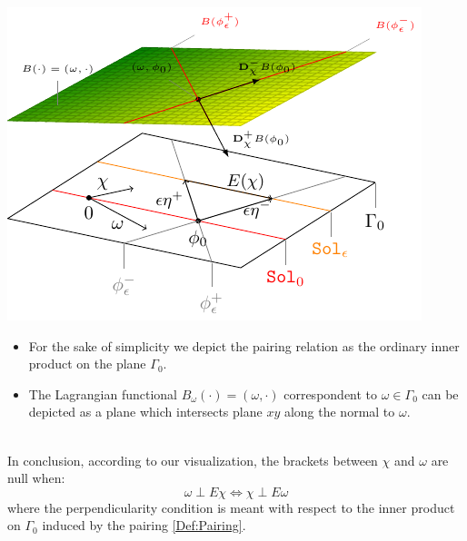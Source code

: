 \documentclass[Main]{subfiles}
\begin{document}
		\vspace{1mm}		
		\begin{minipage}{0.5\textwidth}
			\includegraphics[width=\textwidth]{Pictures/compsupp_GeometricPictureLinear}
		\end{minipage}
		\begin{minipage}{0.5\textwidth}
			\begin{itemize}
				\item For the sake of simplicity we depict the pairing relation as the ordinary inner product  on the plane $\Gamma_0$.
				\item The Lagrangian functional $B_\omega (\cdot) = (\omega, \cdot)$ correspondent to  $\omega \in \Gamma_0$  can be depicted as a plane which intersects plane $ x y$ along the normal to $\omega$.
			\end{itemize}
		\end{minipage}
		\vspace{1mm}\\	
	
		In conclusion, according to our visualization, the brackets between $\chi$ and $\omega$ are null when:
		\begin{displaymath}
		 \omega \perp E \chi \Longleftrightarrow \chi \perp E \omega
		\end{displaymath}
		where the perpendicularity condition is meant with respect to the inner product on $\Gamma_0$ induced by the pairing \ref{Def:Pairing}.
		
\end{document}
